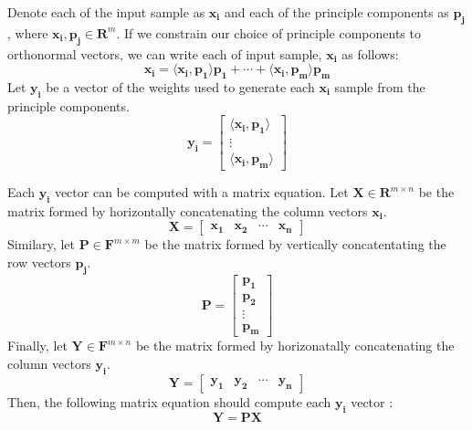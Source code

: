 \documentclass[conference]{IEEEtran}
\begin{document}
    Denote each of the input sample as $\mathbf{x_i}$ and each of the principle components as $\mathbf{p_j}$, where $\mathbf{x_i}, \mathbf{p_j} \in \mathbf{R}^{m}$. If we constrain our choice of principle components to orthonormal vectors, we can write each of input sample, $\mathbf{x_i}$ as follows:
    \begin{equation}
    		\mathbf{x_i} = \langle \mathbf{x_i}, \mathbf{p_1} \rangle \mathbf{p_1} + \cdots + \langle \mathbf{x_i}, \mathbf{p_m} \rangle \mathbf{p_m}
    	\end{equation}
    	Let $\mathbf{y_i}$ be a vector of the weights used to generate each $\mathbf{x_i}$ sample from the principle components.
    	\begin{equation}
        \mathbf{y_i} = \begin{bmatrix}
                        \langle \mathbf{x_i}, \mathbf{p_1} \rangle\\
                        \vdots \\
                        \langle \mathbf{x_i}, \mathbf{p_m}\rangle
                        \end{bmatrix}
    \end{equation}
    
    	Each $\mathbf{y_i}$ vector can be computed with a matrix equation. Let $\mathbf{X} \in \mathbf{R}^{m \times n}$ be the matrix formed by horizontally concatenating the column vectors $\mathbf{x_i}$.
    \begin{equation}
    		\mathbf{X} = \begin{bmatrix}
    			\mathbf{x_1} & \mathbf{x_2} & \cdots & \mathbf{x_n}
    		\end{bmatrix}
    	\end{equation}
    	Similary, let $\mathbf{P} \in \mathbf{F}^{m \times m}$ be the matrix formed by vertically concatentating the row vectors $\mathbf{p_j}$.
	\begin{equation}
    		\mathbf{P} = \begin{bmatrix}
    			\mathbf{p_1} \\ \mathbf{p_2} \\ \vdots \\ \mathbf{p_m}
    		\end{bmatrix}
    	\end{equation}
    	Finally, let $\mathbf{Y} \in \mathbf{F}^{m \times n}$ be the matrix formed by horizonatally concatenating the column vectors $\mathbf{y_i}$.
    \begin{equation}
    		\mathbf{Y} = \begin{bmatrix}
    			\mathbf{y_1} & \mathbf{y_2} & \cdots & \mathbf{y_n}
    		\end{bmatrix}
    	\end{equation}
    	Then, the following matrix equation should compute each $\mathbf{y_i}$ vector \cite{shlens_2014_tutorial}:
    	\begin{equation}
    		\mathbf{Y} = \mathbf{P}\mathbf{X}
    	\end{equation}
    	
\end{document}
